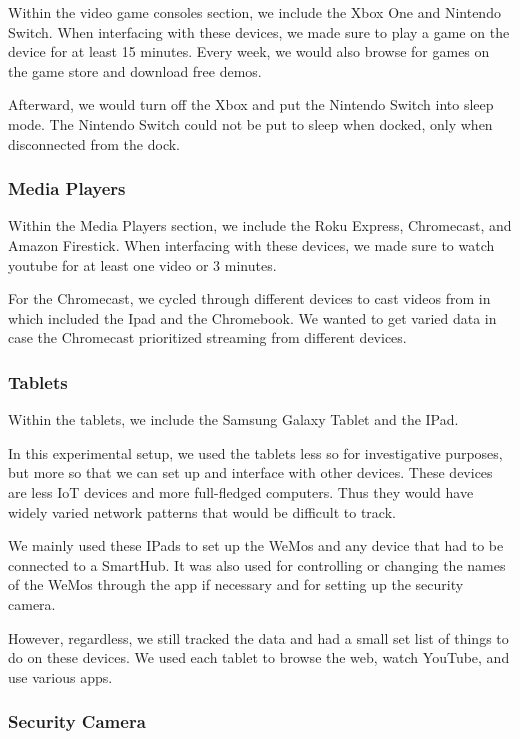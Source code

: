 Within the video game consoles section, we include the Xbox One and Nintendo Switch. When interfacing with these devices, we made sure to play a game on the device for at least 15 minutes. Every week, we would also browse for games on the game store and download free demos.

Afterward, we would turn off the Xbox and put the Nintendo Switch into sleep mode. The Nintendo Switch could not be put to sleep when docked, only when disconnected from the dock.

\subsubsection{Media Players}

Within the Media Players section, we include the Roku Express, Chromecast, and Amazon Firestick. When interfacing with these devices, we made sure to watch youtube for at least one video or 3 minutes.

For the Chromecast, we cycled through different devices to cast videos from in which included the Ipad and the Chromebook. We wanted to get varied data in case the Chromecast prioritized streaming from different devices.

\subsubsection{Tablets}

Within the tablets, we include the Samsung Galaxy Tablet and the IPad.

In this experimental setup, we used the tablets less so for investigative purposes, but more so that we can set up and interface with other devices. These devices are less IoT devices and more full-fledged computers. Thus they would have widely varied network patterns that would be difficult to track.

We mainly used these IPads to set up the WeMos and any device that had to be connected to a SmartHub. It was also used for controlling or changing the names of the WeMos through the app if necessary and for setting up the security camera.

However, regardless, we still tracked the data and had a small set list of things to do on these devices. We used each tablet to browse the web, watch YouTube, and use various apps.

\subsubsection{Security Camera}

